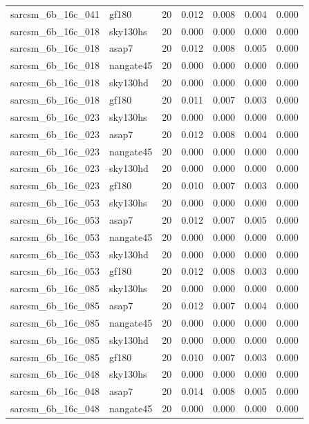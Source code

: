 \begin{tabular}{llrrrrr}
sarcsm\_6b\_16c\_041 & gf180 & 20 & 0.012 & 0.008 & 0.004 & 0.000 \\
sarcsm\_6b\_16c\_018 & sky130hs & 20 & 0.000 & 0.000 & 0.000 & 0.000 \\
sarcsm\_6b\_16c\_018 & asap7 & 20 & 0.012 & 0.008 & 0.005 & 0.000 \\
sarcsm\_6b\_16c\_018 & nangate45 & 20 & 0.000 & 0.000 & 0.000 & 0.000 \\
sarcsm\_6b\_16c\_018 & sky130hd & 20 & 0.000 & 0.000 & 0.000 & 0.000 \\
sarcsm\_6b\_16c\_018 & gf180 & 20 & 0.011 & 0.007 & 0.003 & 0.000 \\
sarcsm\_6b\_16c\_023 & sky130hs & 20 & 0.000 & 0.000 & 0.000 & 0.000 \\
sarcsm\_6b\_16c\_023 & asap7 & 20 & 0.012 & 0.008 & 0.004 & 0.000 \\
sarcsm\_6b\_16c\_023 & nangate45 & 20 & 0.000 & 0.000 & 0.000 & 0.000 \\
sarcsm\_6b\_16c\_023 & sky130hd & 20 & 0.000 & 0.000 & 0.000 & 0.000 \\
sarcsm\_6b\_16c\_023 & gf180 & 20 & 0.010 & 0.007 & 0.003 & 0.000 \\
sarcsm\_6b\_16c\_053 & sky130hs & 20 & 0.000 & 0.000 & 0.000 & 0.000 \\
sarcsm\_6b\_16c\_053 & asap7 & 20 & 0.012 & 0.007 & 0.005 & 0.000 \\
sarcsm\_6b\_16c\_053 & nangate45 & 20 & 0.000 & 0.000 & 0.000 & 0.000 \\
sarcsm\_6b\_16c\_053 & sky130hd & 20 & 0.000 & 0.000 & 0.000 & 0.000 \\
sarcsm\_6b\_16c\_053 & gf180 & 20 & 0.012 & 0.008 & 0.003 & 0.000 \\
sarcsm\_6b\_16c\_085 & sky130hs & 20 & 0.000 & 0.000 & 0.000 & 0.000 \\
sarcsm\_6b\_16c\_085 & asap7 & 20 & 0.012 & 0.007 & 0.004 & 0.000 \\
sarcsm\_6b\_16c\_085 & nangate45 & 20 & 0.000 & 0.000 & 0.000 & 0.000 \\
sarcsm\_6b\_16c\_085 & sky130hd & 20 & 0.000 & 0.000 & 0.000 & 0.000 \\
sarcsm\_6b\_16c\_085 & gf180 & 20 & 0.010 & 0.007 & 0.003 & 0.000 \\
sarcsm\_6b\_16c\_048 & sky130hs & 20 & 0.000 & 0.000 & 0.000 & 0.000 \\
sarcsm\_6b\_16c\_048 & asap7 & 20 & 0.014 & 0.008 & 0.005 & 0.000 \\
sarcsm\_6b\_16c\_048 & nangate45 & 20 & 0.000 & 0.000 & 0.000 & 0.000 \\

\end{tabular}
